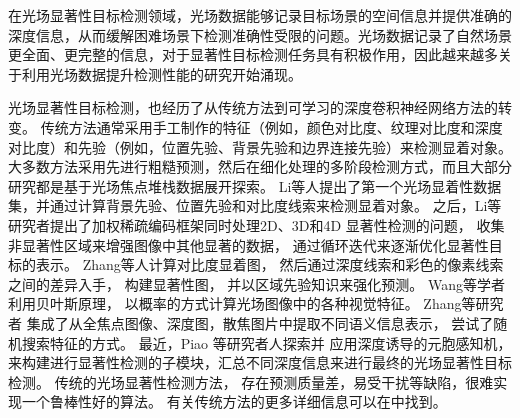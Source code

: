 







\label{chpt1:title:lf_methods}


在光场显著性目标检测领域，光场数据能够记录目标场景的空间信息并提供准确的深度信息，从而缓解困难场景下检测准确性受限的问题。光场数据记录了自然场景更全面、更完整的信息，对于显著性目标检测任务具有积极作用，因此越来越多关于利用光场数据提升检测性能的研究开始涌现。






光场显著性目标检测，也经历了从传统方法到可学习的深度卷积神经网络方法的转变。
传统方法通常采用手工制作的特征（例如，颜色对比度、纹理对比度和深度对比度）和先验（例如，位置先验、背景先验和边界连接先验）来检测显着对象。 
大多数方法采用先进行粗糙预测，然后在细化处理的多阶段检测方式，而且大部分研究都是基于光场焦点堆栈数据展开探索。
%
%
Li等人提出了第一个光场显着性数据集，并通过计算背景先验、位置先验和对比度线索来检测显着对象。
之后，Li等研究者提出了加权稀疏编码框架同时处理2D、3D和4D 显著性检测的问题，
收集非显著性区域来增强图像中其他显著的数据，
通过循环迭代来逐渐优化显著性目标的表示。
Zhang等人计算对比度显着图，
然后通过深度线索和彩色的像素线索之间的差异入手，
构建显著性图，
并以区域先验知识来强化预测。
Wang等学者利用贝叶斯原理，
以概率的方式计算光场图像中的各种视觉特征。
Zhang等研究者
集成了从全焦点图像、深度图，散焦图片中提取不同语义信息表示，
尝试了随机搜索特征的方式。
最近，Piao 等研究者人探索并
应用深度诱导的元胞感知机，
来构建进行显著性检测的子模块，汇总不同深度信息来进行最终的光场显著性目标检测。
传统的光场显著性检测方法，
存在预测质量差，易受干扰等缺陷，很难实现一个鲁棒性好的算法。
有关传统方法的更多详细信息可以在中找到。


